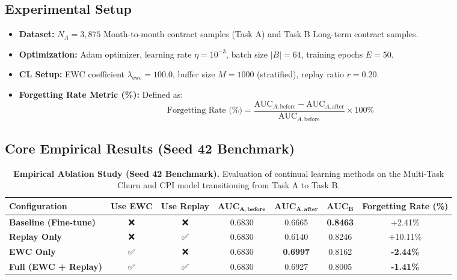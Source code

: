 \documentclass{article}
\begin{document}
\subsection{Experimental Setup}
\begin{itemize}
    \item \textbf{Dataset:} $N_A = 3,875$ Month-to-month contract samples (Task A) and Task B Long-term contract samples.
    \item \textbf{Optimization:} Adam optimizer, learning rate $\eta = 10^{-3}$, batch size $|B| = 64$, training epochs $E = 50$.
    \item \textbf{CL Setup:} EWC coefficient $\lambda_{\text{ewc}} = 100.0$, buffer size $M = 1000$ (stratified), replay ratio $r = 0.20$.
    \item \textbf{Forgetting Rate Metric (\%):} Defined as:
    \begin{equation}
    \text{Forgetting Rate (\%)} = \frac{\text{AUC}_{A, \text{before}} - \text{AUC}_{A, \text{after}}}{\text{AUC}_{A, \text{before}}} \times 100\%
    \end{equation}
\end{itemize}

\subsection{Core Empirical Results (Seed 42 Benchmark)}

\begin{table}[h]
\centering
\caption{\textbf{Empirical Ablation Study (Seed 42 Benchmark).} Evaluation of continual learning methods on the Multi-Task Churn and CPI model transitioning from Task A to Task B.}
\label{tab:ablation_results}
\vspace{0.2cm}
\begin{tabular}{lcccccc}
\toprule
\textbf{Configuration} & \textbf{Use EWC} & \textbf{Use Replay} & $\mathbf{\text{AUC}_{A, \text{before}}}$ & $\mathbf{\text{AUC}_{A, \text{after}}}$ & $\mathbf{\text{AUC}_{B}}$ & \textbf{Forgetting Rate (\%)} \\
\midrule
\textbf{Baseline (Fine-tune)} & ❌ & ❌ & 0.6830 & 0.6665 & \textbf{0.8463} & +2.41\% \\
\textbf{Replay Only} & ❌ & ✅ & 0.6830 & 0.6140 & 0.8246 & +10.11\% \\
\textbf{EWC Only} & ✅ & ❌ & 0.6830 & \textbf{0.6997} & 0.8162 & \textbf{-2.44\%} \\
\textbf{Full (EWC + Replay)} & ✅ & ✅ & 0.6830 & 0.6927 & 0.8005 & \textbf{-1.41\%} \\
\bottomrule
\end{tabular}
\end{table}
\end{document}
